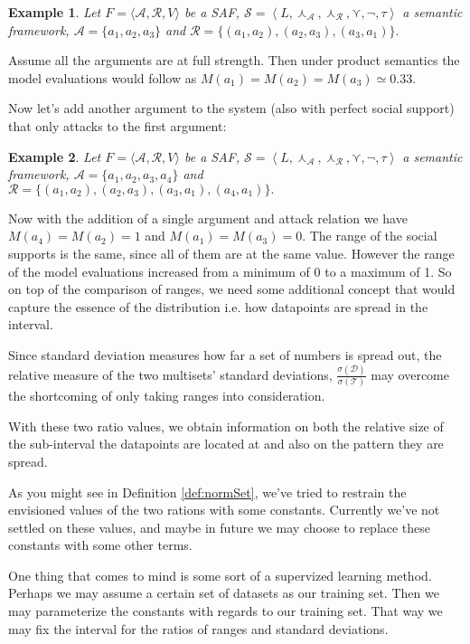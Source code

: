 \documentclass{article}
\newtheorem{example}{Example}
\newcommand{\args}{\mathcal{A}} %
\newcommand{\att}{\mathcal{R}}  %
\newcommand{\valueset}{L}
\newcommand{\safid}{F}               %
\newcommand{\saf}{\safid = \safbody} %
\newcommand{\safbody}{\langle \args, \att, V \rangle} %
\newcommand{\sembodyNew}{\left\langle \valueset,\SAFand_\mathcal{A}, \SAFand_\mathcal{R},\SAFor,\lnot,\tau \right\rangle} %
\newcommand{\SAFand}{\curlywedge}     %
\newcommand{\SAFor}{\curlyvee}        %
\newcommand{\sem}{\mathcal{S}}
\newcommand{\dataset}{\mathcal{D}}   %
\newcommand{\ssset}{\mathcal{T}}   %
\begin{document}
\begin{example}
Let $\saf$ be a SAF, $\sem = \sembodyNew$ a semantic framework, $\args =\{a_1, a_2, a_3\}$ and $\att = \{(a_1,a_2), (a_2,a_3), (a_3,a_1)\}.$
\end{example}

Assume all the arguments are at full strength. Then under product semantics the model evaluations would follow as $M(a_1) = M(a_2) = M(a_3) \simeq 0.33$.

Now let's add another argument to the system (also with perfect social support) that only attacks to the first argument:

\begin{example}
Let $\saf$ be a SAF, $\sem = \sembodyNew$ a semantic framework, $\args =\{a_1, a_2, a_3, a_4\}$ and $\att = \{(a_1,a_2), (a_2,a_3), (a_3,a_1), (a_4,a_1)\}.$
\end{example}

Now with the addition of a single argument and attack relation we have $M(a_4) = M(a_2) =  1$ and $M(a_1) = M(a_3) =  0$. The range of the social supports is the same, since all of them are at the same value. However the range of the model evaluations increased from a minimum of 0 to a maximum of 1. So on top of the comparison of ranges, we need some additional concept that would capture the essence of the distribution i.e. how datapoints are spread in the interval.

Since standard deviation measures how far a set of numbers is spread out, the relative measure of the two multisets' standard deviations, $\frac{\sigma(\dataset)}{\sigma(\ssset)}$ may overcome the shortcoming of only taking ranges into consideration. 

With these two ratio values, we obtain information on both the relative size of the sub-interval the datapoints are located at and also on the pattern they are spread. 

As you might see in Definition \ref{def:normSet}, we've tried to restrain the envisioned values of the two rations with some constants. Currently we've not settled on these values, and maybe in future we may choose to replace these constants with some other terms. 

One thing that comes to mind is some sort of a supervized learning method. Perhaps we may assume a certain set of datasets as our training set. Then we may parameterize the constants with regards to our training set. That way we may fix the interval for the ratios of ranges and standard deviations. 
\end{document}
